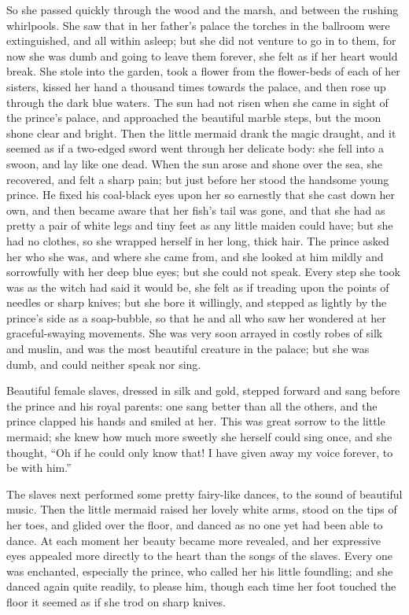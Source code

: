 So she passed quickly through the wood and the marsh, and between the rushing whirlpools.
She saw that in her father’s palace the torches in the ballroom were extinguished, and all within asleep; but she did not venture to go in to them, for now she was dumb and going to leave them forever, she felt as if her heart would break.
She stole into the garden, took a flower from the flower-beds of each of her sisters, kissed her hand a thousand times towards the palace, and then rose up through the dark blue waters.
The sun had not risen when she came in sight of the prince’s palace, and approached the beautiful marble steps, but the moon shone clear and bright.
Then the little mermaid drank the magic draught, and it seemed as if a two-edged sword went through her delicate body: she fell into a swoon, and lay like one dead.
When the sun arose and shone over the sea, she recovered, and felt a sharp pain; but just before her stood the handsome young prince.
He fixed his coal-black eyes upon her so earnestly that she cast down her own, and then became aware that her fish’s tail was gone, and that she had as pretty a pair of white legs and tiny feet as any little maiden could have; but she had no clothes, so she wrapped herself in her long, thick hair.
The prince asked her who she was, and where she came from, and she looked at him mildly and sorrowfully with her deep blue eyes; but she could not speak.
Every step she took was as the witch had said it would be, she felt as if treading upon the points of needles or sharp knives; but she bore it willingly, and stepped as lightly by the prince’s side as a soap-bubble, so that he and all who saw her wondered at her graceful-swaying movements.
She was very soon arrayed in costly robes of silk and muslin, and was the most beautiful creature in the palace; but she was dumb, and could neither speak nor sing.

Beautiful female slaves, dressed in silk and gold, stepped forward and sang before the prince and his royal parents: one sang better than all the others, and the prince clapped his hands and smiled at her.
This was great sorrow to the little mermaid; she knew how much more sweetly she herself could sing once, and she thought, ``Oh if he could only know that! I have given away my voice forever, to be with him.''

The slaves next performed some pretty fairy-like dances, to the sound of beautiful music.
Then the little mermaid raised her lovely white arms, stood on the tips of her toes, and glided over the floor, and danced as no one yet had been able to dance.
At each moment her beauty became more revealed, and her expressive eyes appealed more directly to the heart than the songs of the slaves.
Every one was enchanted, especially the prince, who called her his little foundling; and she danced again quite readily, to please him, though each time her foot touched the floor it seemed as if she trod on sharp knives.


